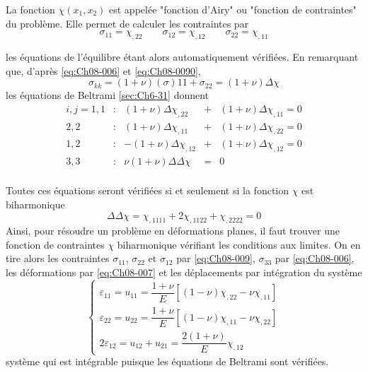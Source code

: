 La fonction $\chi(x_1,x_2)$ est appelée "fonction d'Airy" ou "fonction de contrain­tes" du problème. 
Elle permet de calculer les contraintes par 
\begin{equation}
\sigma_{11}=\chi_{,22} \qquad \sigma_{12}=\chi_{,12} \qquad \sigma_{22}=\chi_{,11}
    \label{eq:Ch08-009}
\end{equation}

les équations de l'équilibre étant alors automatiquement vérifiées. 
En remarquant que, d'après \eqref{eq:Ch08-006} et \eqref{eq:Ch08-0090}, 
\begin{equation}
\sigma_{kk}=(1+\nu)(\sigma){11}+\sigma_{22}=(1+\nu)\Delta\chi
\label{eq:Ch08-010}
\end{equation}
les équations de Beltrami \ref{sec:Ch6-31} donnent 
\begin{equation}
  \begin{aligned}
  i,j = 1,1 & : &  (1+\nu) \Delta\chi_{,22} & + & (1+\nu) \Delta\chi_{,11}=0 \\
        2,2 & : &  (1+\nu) \Delta\chi_{,11} & + & (1+\nu) \Delta\chi_{,22}=0 \\ 
        1,2 & : & -(1+\nu) \Delta\chi_{,12} & + & (1+\nu) \Delta\chi_{,12}=0 \\
        3,3 & : & \nu(1+\nu) \Delta\Delta\chi & = & 0 \\
  \end{aligned}
\label{eq:Ch08-011}
\end{equation}

Toutes ces équations seront vérifiées si et seulement si la fonction $\chi$ est biharmonique 
\begin{equation}
\Delta\Delta\chi=\chi_{,1111}+2\chi_{,1122}+\chi_{,2222}=0
\label{eq:Ch08-012}
\end{equation}
Ainsi, pour résoudre un problème en déformations planes, il faut trouver une fonction de contraintes $\chi$ biharmonique vérifiant les condi­tions aux limites. 
On en tire alors les contraintes $\sigma_{11}$, $\sigma_{22}$ et $\sigma_{12}$ par \eqref{eq:Ch08-009}, $\sigma_{33}$ par \eqref{eq:Ch08-006}, les déformations par \eqref{eq:Ch08-007} et les déplacements par inté­gration du système 
\begin{equation}
  \begin{cases}
  \varepsilon_{11}=u_{11}=\dfrac{1+\nu}{E}[(1-\nu)\chi_{,22}-\nu\chi_{,11}] \\
  \varepsilon_{22}=u_{22}=\dfrac{1+\nu}{E}[(1-\nu)\chi_{,11}-\nu\chi_{,22}] \\
  2\varepsilon_{12}=u_{12}+u_{21}=\dfrac{2(1+\nu)}{E}\chi_{,12}
  \end{cases}
\label{eq:Ch08-013}
\end{equation}
système qui est intégrable puisque les équations de Beltrami sont vérifiées. 

